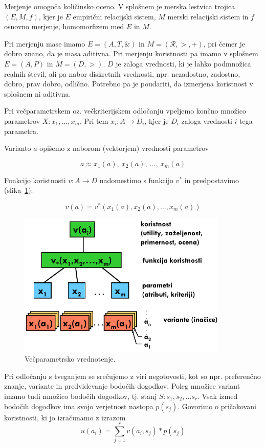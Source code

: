 Merjenje omogoča količinsko oceno. V splošnem je merska lestvica trojica $(E, M, f)$, kjer je $E$ empirični relacijski sistem, $M$ merski relacijski sistem in $f$ osnovno merjenje, homomorfizem med $E$ in $M$.

Pri merjenju mase imamo $E=(A,T,\&)$ in $M=(\mathcal{R},>,+)$, pri čemer je dobro znano, da je masa aditivna. Pri merjenju koristnosti pa imamo v splošnem $E = (A, P)$ in $M = (D, >)$. $D$ je zaloga vrednosti, ki je lahko podmnožica realnih števil, ali pa nabor diskretnih vrednosti, npr. nezadostno, zadostno, dobro, prav dobro, odlično. Potrebno pa je poudariti, da izmerjena koristnost v splošnem ni aditivna.

Pri večparametrskem oz. večkriterijskem odločanju vpeljemo končno množico parametrov $X: x_1, \ldots, x_m$. Pri tem  $x_i: A \rightarrow D_i$, kjer je $D_i$ zaloga vrednosti $i$-tega parametra.

Varianto $a$ opišemo z naborom (vektorjem) vrednosti parametrov 

$$ a \approx x_1(a),\ x_2(a),\ \ldots,\ x_m(a) $$

Funkcijo koristnosti $v: A \rightarrow D$ nadomestimo s funkcijo $v^*$ in predpostavimo (slika~\ref{f-vecparametrsko-vrednotenje}):

$$ v(a) = v^*(x_1(a), x_2(a), \ldots , x_m(a)) $$ 

\begin{figure}[htbp]
\begin{center}
\includegraphics[width=10cm]{slike/vecparametrsko-vrednotenje.pdf}
\caption{Večparametrsko vrednotenje.}
\label{f-vecparametrsko-vrednotenje}
\end{center}
\end{figure}

\mbox{}

Pri odločanju s tveganjem se srečujemo z viri negotovosti, kot so npr. preferenčno znanje, variante in predvidevanje bodočih dogodkov. Poleg množice variant imamo tudi množico bodočih dogodkov, tj. stanj $S: s_1, s_2, \ldots s_r$. Vsak izmed bodočih dogodkov ima svojo verjetnost nastopa $p(s_j)$. Govorimo o pričakovani koristnosti, ki jo izračunamo z izrazom
%
$$u(a_i)=\sum_{j=1}^rv(a_i,s_j)*p(s_j)$$

